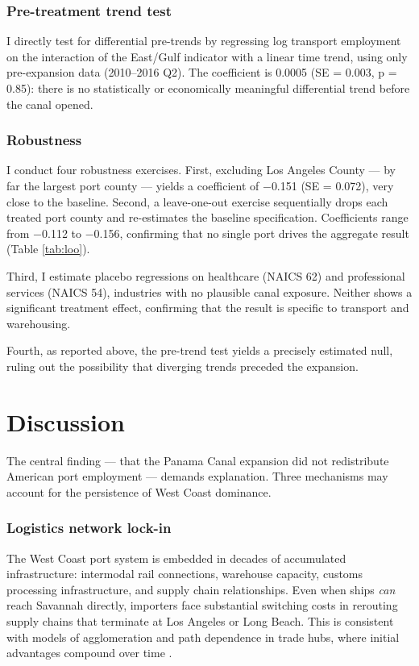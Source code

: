 \documentclass[12pt]{article}
\begin{document}
\subsubsection*{Pre-treatment trend test} I directly test for differential pre-trends by regressing log transport employment on the interaction of the East/Gulf indicator with a linear time trend, using only pre-expansion data (2010--2016 Q2). The coefficient is 0.0005 (SE = 0.003, p = 0.85): there is no statistically or economically meaningful differential trend before the canal opened.

\subsubsection*{Robustness} I conduct four robustness exercises. First, excluding Los Angeles County --- by far the largest port county --- yields a coefficient of $-$0.151 (SE = 0.072), very close to the baseline. Second, a leave-one-out exercise sequentially drops each treated port county and re-estimates the baseline specification. Coefficients range from $-$0.112 to $-$0.156, confirming that no single port drives the aggregate result (Table \ref{tab:loo}).



Third, I estimate placebo regressions on healthcare (NAICS 62) and professional services (NAICS 54), industries with no plausible canal exposure. Neither shows a significant treatment effect, confirming that the result is specific to transport and warehousing.

Fourth, as reported above, the pre-trend test yields a precisely estimated null, ruling out the possibility that diverging trends preceded the expansion.

\section{Discussion}

The central finding --- that the Panama Canal expansion did not redistribute American port employment --- demands explanation. Three mechanisms may account for the persistence of West Coast dominance.

\subsubsection*{Logistics network lock-in} The West Coast port system is embedded in decades of accumulated infrastructure: intermodal rail connections, warehouse capacity, customs processing infrastructure, and supply chain relationships. Even when ships \textit{can} reach Savannah directly, importers face substantial switching costs in rerouting supply chains that terminate at Los Angeles or Long Beach. This is consistent with models of agglomeration and path dependence in trade hubs, where initial advantages compound over time \citep{fujita1999, krugman1991}.
\end{document}
